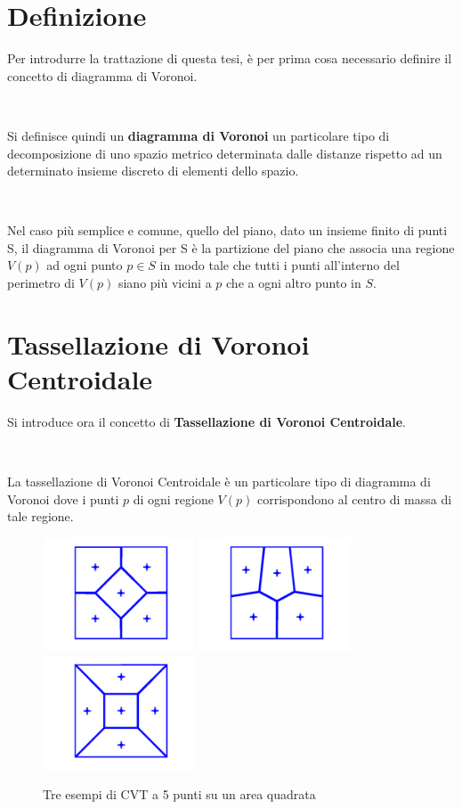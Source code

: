 \documentclass[11pt,a4paper]{report}
\begin{document}
\section{Definizione}

Per introdurre la trattazione di questa tesi, è per prima cosa necessario definire il concetto di diagramma di Voronoi.

\

Si definisce quindi un \textbf{diagramma di Voronoi} un particolare tipo di decomposizione di uno spazio metrico determinata dalle distanze rispetto ad un determinato insieme discreto di elementi dello spazio.

\

Nel caso più semplice e comune, quello del piano, dato un insieme finito di punti S, il diagramma di Voronoi per S è la partizione del piano che associa una regione $V(p)$ ad ogni punto $p \in S$ in modo tale che tutti i punti all'interno del perimetro di $V(p)$ siano più vicini a $p$ che a ogni altro punto in $S$.

\section{Tassellazione di Voronoi Centroidale}

Si introduce ora il concetto di \textbf{Tassellazione di Voronoi Centroidale}.

\

La tassellazione di Voronoi Centroidale è un particolare tipo di diagramma di Voronoi dove i punti $p$ di ogni regione $V(p)$ corrispondono al centro di massa di tale regione.

\begin{figure}[H]
	\centering
	\includegraphics[width=4.5cm]{cvt1.png}
	\includegraphics[width=4.5cm]{cvt2.png}
	\includegraphics[width=4.5cm]{cvt3.png}
	\caption{Tre esempi di CVT a 5 punti su un area quadrata}
\end{figure}
\end{document}
